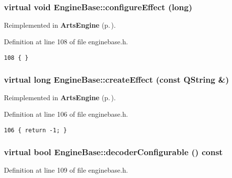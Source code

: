 \subsubsection{\setlength{\rightskip}{0pt plus 5cm}virtual void Engine\-Base::configure\-Effect (long)\hspace{0.3cm}{\tt  [inline, virtual, inherited]}}\label{classEngineBase_EngineBasea22}




Reimplemented in {\bf Arts\-Engine} {\rm (p.\,\pageref{classArtsEngine_ArtsEnginea16})}.

Definition at line 108 of file enginebase.h.



\footnotesize\begin{verbatim}108 { }
\end{verbatim}\normalsize 
{}
\subsubsection{\setlength{\rightskip}{0pt plus 5cm}virtual long Engine\-Base::create\-Effect (const QString \&)\hspace{0.3cm}{\tt  [inline, virtual, inherited]}}\label{classEngineBase_EngineBasea20}




Reimplemented in {\bf Arts\-Engine} {\rm (p.\,\pageref{classArtsEngine_ArtsEnginea14})}.

Definition at line 106 of file enginebase.h.



\footnotesize\begin{verbatim}106 { return -1; }
\end{verbatim}\normalsize 
{}
\subsubsection{\setlength{\rightskip}{0pt plus 5cm}virtual bool Engine\-Base::decoder\-Configurable () const\hspace{0.3cm}{\tt  [inline, virtual, inherited]}}\label{classEngineBase_EngineBasea23}




Definition at line 109 of file enginebase.h.



